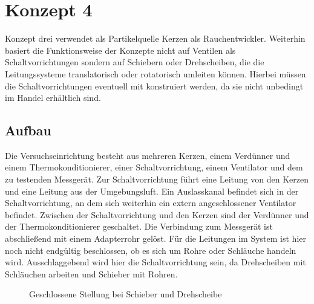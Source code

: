 \section{Konzept 4}
Konzept drei verwendet als Partikelquelle Kerzen als Rauchentwickler. Weiterhin basiert die Funktionsweise der Konzepte nicht auf Ventilen als Schaltvorrichtungen sondern auf Schiebern oder Drehscheiben, die die Leitungssysteme translatorisch oder rotatorisch umleiten k\"{o}nnen. Hierbei m\"{u}ssen die Schaltvorrichtungen eventuell mit konstruiert werden, da sie nicht unbedingt im Handel erh\"{a}ltlich sind.

\subsection{Aufbau}
Die Versuchseinrichtung besteht aus mehreren Kerzen, einem Verd\"{u}nner und einem Thermokonditionierer, einer Schaltvorrichtung, einem Ventilator und dem zu testenden Messger\"{a}t. Zur Schaltvorrichtung f\"{u}hrt eine Leitung von den Kerzen und eine Leitung aus der Umgebungsluft. Ein Auslasskanal befindet sich in der Schaltvorrichtung, an dem sich weiterhin ein extern angeschlossener Ventilator befindet. Zwischen der Schaltvorrichtung und den Kerzen sind der Verd\"{u}nner und der Thermokonditionierer geschaltet. Die Verbindung zum Messger\"{a}t ist abschlie{\ss}end mit einem Adapterrohr gel\"{o}st. F\"{u}r die Leitungen im System ist hier noch nicht endg\"{u}ltig beschlossen, ob es sich um Rohre oder Schl\"{a}uche handeln wird. Ausschlaggebend wird hier die Schaltvorrichtung sein, da Drehscheiben mit Schl\"{a}uchen arbeiten und Schieber mit Rohren.
\begin{figure}[H]
        \myfloatalign
         \quad
        \caption[Geschlossene Stellung bei Schieber und Drehscheibe]
        {Geschlossene Stellung bei Schieber und Drehscheibe}
        \label{fig:concepts_4_off}
\end{figure}

